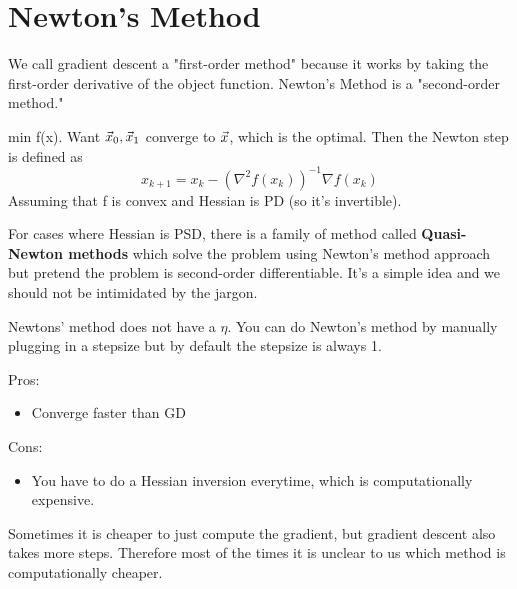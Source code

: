 \section{Newton's Method} %
\label{sec:newton_s_method}

\begin{remark}
	We call gradient descent a "first-order method" because it works by taking the first-order derivative of the object function. Newton's Method is a "second-order method."
\end{remark}

\begin{definition}
	min f(x). Want $\vec{x}_0, \vec{x}_1$ converge to $\vec{x}$, which is the optimal. Then the Newton step is defined as
	\[
x_{k+1} = x_k-(\nabla^2 f(x_k))^{-1}\nabla f(x_k)
	\]
	Assuming that f is convex and Hessian is PD (so it's invertible).
\end{definition}

\begin{remark}
	For cases where Hessian is PSD, there is a family of method called \textbf{Quasi-Newton methods} which solve the problem using Newton's method approach but pretend the problem is second-order differentiable. It's a simple idea and we should not be intimidated by the jargon.
\end{remark}

\begin{remark}
	Newtons' method does not have a $\eta$. You can do Newton's method by manually plugging in a stepsize but by default the stepsize is always 1.
\end{remark}

\begin{remark}
	Pros:
	\begin{itemize}
		\item Converge faster than GD
	\end{itemize}

	\noindent Cons:
	\begin{itemize}
		\item You have to do a Hessian inversion everytime, which is computationally expensive.
	\end{itemize}
	\noindent Sometimes it is cheaper to just compute the gradient, but gradient descent also takes more steps. Therefore most of the times it is unclear to us which method is computationally cheaper.
\end{remark}

